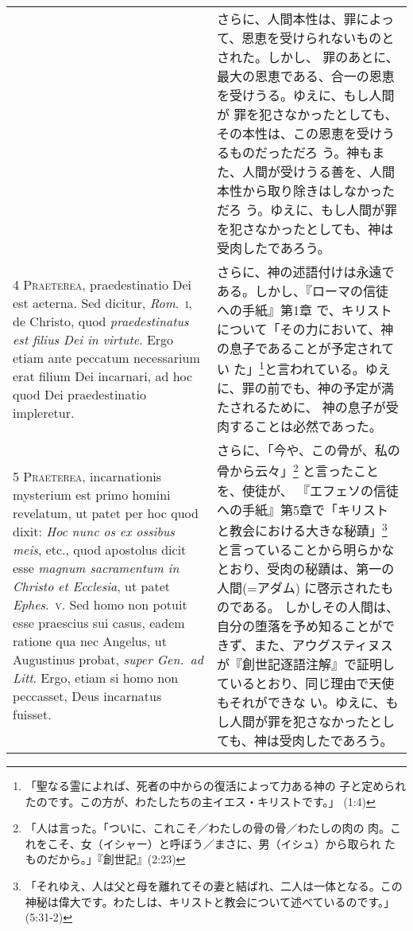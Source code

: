 \documentclass[10pt]{jsarticle} %
\begin{document}
\begin{longtable}{p{21em}p{21em}}
&

さらに、人間本性は、罪によって、恩恵を受けられないものとされた。しかし、
 罪のあとに、最大の恩恵である、合一の恩恵を受けうる。ゆえに、もし人間が
 罪を犯さなかったとしても、その本性は、この恩恵を受けうるものだっただろ
 う。神もまた、人間が受けうる善を、人間本性から取り除きはしなかっただろ
 う。ゆえに、もし人間が罪を犯さなかったとしても、神は受肉したであろう。



\\


4 {\scshape Praeterea}, praedestinatio Dei est
aeterna. Sed dicitur, {\itshape Rom}.~{\scshape i}, de Christo, quod {\itshape praedestinatus est filius
Dei in virtute}. Ergo etiam ante peccatum necessarium erat filium Dei
incarnari, ad hoc quod Dei praedestinatio impleretur.


&


さらに、神の述語付けは永遠である。しかし、『ローマの信徒への手紙』第1章
 で、キリストについて「その力において、神の息子であることが予定されてい
 た」\footnote{「聖なる霊によれば、死者の中からの復活によって力ある神の
 子と定められたのです。この方が、わたしたちの主イエス・キリストです。」
 (1:4)}と言われている。ゆえに、罪の前でも、神の予定が満たされるために、
神の息子が受肉することは必然であった。

\\


5 {\scshape Praeterea}, incarnationis mysterium est
primo homini revelatum, ut patet per hoc quod dixit: {\itshape Hoc nunc os ex
ossibus meis}, etc., quod apostolus dicit esse {\itshape magnum sacramentum in
Christo et Ecclesia}, ut patet {\itshape Ephes}.~{\scshape v}. Sed homo non potuit esse
praescius sui casus, eadem ratione qua nec Angelus, ut Augustinus
probat, {\itshape super Gen.~ad Litt}. Ergo, etiam si homo non peccasset, Deus
incarnatus fuisset.


&

さらに、「今や、この骨が、私の骨から云々」\footnote{「人は言った。「ついに、これこそ／わたしの骨の骨／わたしの肉の
 肉。これをこそ、女（イシャー）と呼ぼう／まさに、男（イシュ）から取られ
 たものだから。」『創世記』(2:23)}
と言ったことを、使徒が、
『エフェソの信徒への手紙』第5章で「キリストと教会における大きな秘蹟」\footnote{「それゆえ、人は父と母を離れてその妻と結ばれ、二人は一体となる。この神秘は偉大です。わたしは、キリストと教会について述べているのです。」(5:31-2)}
と言っていることから明らかなとおり、受肉の秘蹟は、第一の人間(=アダム)
に啓示されたものである。
しかしその人間は、自分の堕落を予め知ることができず、また、アウグスティヌス
 が『創世記逐語注解』で証明しているとおり、同じ理由で天使もそれができな
 い。ゆえに、もし人間が罪を犯さなかったとしても、神は受肉したであろう。




\end{longtable}
\end{document}
